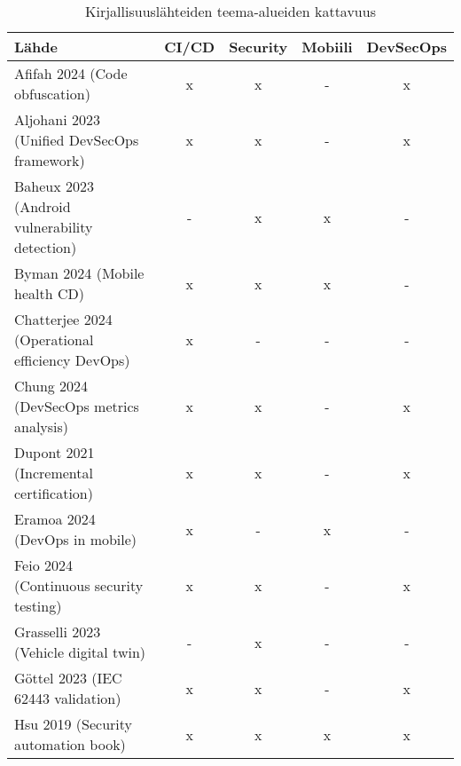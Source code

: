 \documentclass[bscthesis,finnish,oneside,biblatex]{uefcsthesis}
\begin{document}
    \begin{table}[htbp]
        \centering
        \footnotesize
        \caption{Kirjallisuuslähteiden teema-alueiden kattavuus}
        \label{tab:themes}
        \begin{tabular}{p{7cm}cccc}
            \toprule
            \textbf{Lähde}                                  & \textbf{CI/CD} & \textbf{Security} & \textbf{Mobiili} & \textbf{DevSecOps} \\
            \midrule
            Afifah 2024 (Code obfuscation)                  & x              & x                 & -                & x                  \\
            Aljohani 2023 (Unified DevSecOps framework)     & x              & x                 & -                & x                  \\
            Baheux 2023 (Android vulnerability detection)   & -              & x                 & x                & -                  \\
            Byman 2024 (Mobile health CD)                   & x              & x                 & x                & -                  \\
            Chatterjee 2024 (Operational efficiency DevOps) & x              & -                 & -                & -                  \\
            Chung 2024 (DevSecOps metrics analysis)         & x              & x                 & -                & x                  \\
            Dupont 2021 (Incremental certification)         & x              & x                 & -                & x                  \\
            Eramoa 2024 (DevOps in mobile)                  & x              & -                 & x                & -                  \\
            Feio 2024 (Continuous security testing)         & x              & x                 & -                & x                  \\
            Grasselli 2023 (Vehicle digital twin)           & -              & x                 & -                & -                  \\
            Göttel 2023 (IEC 62443 validation)              & x              & x                 & -                & x                  \\
            Hsu 2019 (Security automation book)             & x              & x                 & x                & x                  \\

\end{tabular}
\end{table}
\end{document}
